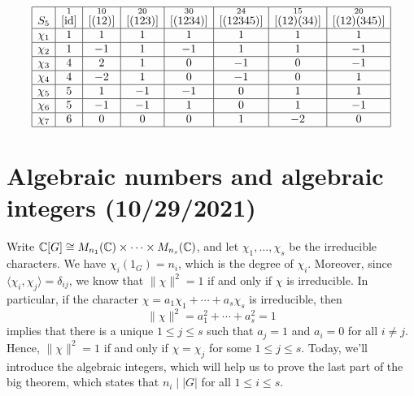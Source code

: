 \begin{exmp}{}
\begin{align*}
\begin{array}{|c|c|c|c|c|c|c|c|}
            \hline
            S_5    & \overset{1}{[\operatorname{id}]} & \overset{10}{[(12)]} & \overset{20}{[(123)]} & \overset{30}{[(1234)]} & \overset{24}{[(12345)]} & \overset{15}{[(12)(34)]} & \overset{20}{[(12)(345)]} \\ \hline
            \chi_1 & 1                  & 1                    & 1                     & 1                      & 1                       & 1                        & 1                         \\ \hline
            \chi_2 & 1                  & -1                   & 1                     & -1                     & 1                       & 1                        & -1                        \\ \hline
            \chi_3 & 4                  & 2                    & 1                     & 0                      & -1                      & 0                        & -1                        \\ \hline
            \chi_4 & 4                  & -2                   & 1                     & 0                      & -1                      & 0                        & 1                         \\ \hline
            \chi_5 & 5                  & 1                    & -1                    & -1                     & 0                       & 1                        & 1                         \\ \hline
            \chi_6 & 5                  & -1                   & -1                    & 1                      & 0                       & 1                        & -1                        \\ \hline
            \chi_7 & 6                  & 0                    & 0                     & 0                      & 1                       & -2                       & 0                         \\ \hline
        \end{array} 
    \end{align*}
\end{exmp}

\section{Algebraic numbers and algebraic integers (10/29/2021)}
Write $\mathbb{C}[G] \cong M_{n_1}(\mathbb{C}) \times \cdots \times M_{n_s}(\mathbb{C})$, and let 
$\chi_1, \dots, \chi_s$ be the irreducible characters. We have $\chi_i(1_G) 
= n_i$, which is the degree of $\chi_i$. Moreover, since $\langle \chi_i, 
\chi_j \rangle = \delta_{ij}$, we know that $\|\chi\|^2 = 1$ if and only if 
$\chi$ is irreducible. In particular, if the character $\chi = a_1 \chi_1 
+ \cdots + a_s \chi_s$ is irreducible, then 
\[ \|\chi\|^2 = a_1^2 + \cdots + a_s^2 = 1 \] 
implies that there is a unique $1 \leq j \leq s$ such that $a_j = 1$ and $a_i = 0$ 
for all $i \neq j$. Hence, $\|\chi\|^2 = 1$ if and only if $\chi = \chi_j$ for some 
$1 \leq j \leq s$. Today, we'll introduce the algebraic integers, which will help 
us to prove the last part of the big theorem, which states that $n_i \mid |G|$ for all 
$1 \leq i \leq s$. 

